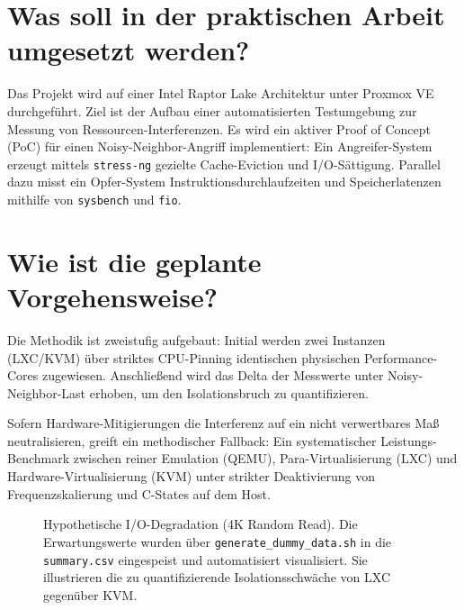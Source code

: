 \documentclass[conference]{IEEEtran}
\begin{document}
\section{Was soll in der praktischen Arbeit umgesetzt werden?}
Das Projekt wird auf einer Intel Raptor Lake Architektur unter Proxmox VE durchgeführt. Ziel ist der Aufbau einer automatisierten Testumgebung zur Messung von Ressourcen-Interferenzen. Es wird ein aktiver Proof of Concept (PoC) für einen Noisy-Neighbor-Angriff implementiert: Ein Angreifer-System erzeugt mittels \texttt{stress-ng} gezielte Cache-Eviction und I/O-Sättigung. Parallel dazu misst ein Opfer-System Instruktionsdurchlaufzeiten und Speicherlatenzen mithilfe von \texttt{sysbench} und \texttt{fio}.

\section{Wie ist die geplante Vorgehensweise?}
Die Methodik ist zweistufig aufgebaut: Initial werden zwei Instanzen (LXC/KVM) über striktes CPU-Pinning identischen physischen Performance-Cores zugewiesen. Anschließend wird das Delta der Messwerte unter Noisy-Neighbor-Last erhoben, um den Isolationsbruch zu quantifizieren.

Sofern Hardware-Mitigierungen die Interferenz auf ein nicht verwertbares Maß neutralisieren, greift ein methodischer Fallback: Ein systematischer Leistungs-Benchmark zwischen reiner Emulation (QEMU), Para-Virtualisierung (LXC) und Hardware-Virtualisierung (KVM) unter strikter Deaktivierung von Frequenzskalierung und C-States auf dem Host.

\begin{figure}[htbp]
\centering
{}
\caption{Hypothetische I/O-Degradation (4K Random Read). Die Erwartungswerte wurden über \texttt{generate\_dummy\_data.sh} in die \texttt{summary.csv} eingespeist und automatisiert visualisiert. Sie illustrieren die zu quantifizierende Isolationsschwäche von LXC gegenüber KVM.}
\label{fig:expected_degradation}
\end{figure}
\end{document}
